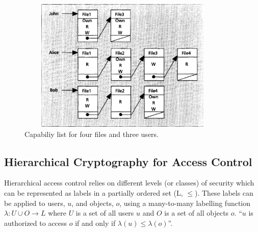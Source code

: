 \documentclass[12pt, titlepage]{article}
\begin{document}
\begin{figure}
\centerline{\includegraphics[height=2.5in,width=4in,angle=0]{capabilities.pdf}}
\caption{Capabiliy list for four files and three users.\cite{accessControlPrinciples}}
\label{fig:capabilities}
\end{figure}

\subsection{Hierarchical Cryptography for Access Control}
Hierarchical access control relies on different levels (or classes) of security which can be represented as labels in a partially ordered set (L, $≤$). These labels can be applied to users, $u$, and objects, $o$, using a many-to-many labelling function $\lambda : U ∪ O → L$ where $U$ is a set of all users $u$ and $O$ is a set of all objects $o$. ``$u$ is authorized to access $o$ if and only if $\lambda(u)≤\lambda(o)$''\cite{mainPaper}.
\end{document}
